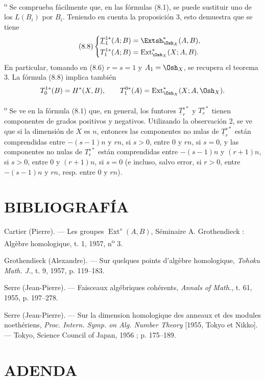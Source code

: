 \medskip
{}\textsuperscript{o} Se comprueba fácilmente que, en las fórmulas
(8.1), se puede sustituir uno de los $L(B_i)$ por $B_i$. Teniendo en cuenta la
proposición 3, esto demuestra que se tiene
\begin{equation}\tag{8.8}
\left\{
\begin{aligned}
  \underline{T}_{1}^{1*}(A;B)&=\Extsh_{\Osh_X}^{*}(A,B),\\
  T_{1}^{1*}(A;B)&=\operatorname{Ext}_{\Osh_X}^{*}(X;A,B).
\end{aligned}
\right.
\end{equation}
En particular, tomando en (8.6) $r=s=1$ y $A_1=\Osh_X$, se recupera el
teorema 3. La fórmula (8.8) implica también
\[
  T_{0}^{1*}(B)=H^{*}(X,B),
  \qquad
  T_{1}^{0*}(A)=\operatorname{Ext}_{\Osh_X}^{*}(X;A,\Osh_X).
\]

\medskip
{}\textsuperscript{o} Se ve en la fórmula (8.1) que, en general, los
funtores $\underline{T}_{r}^{s*}$ y $T_{r}^{s*}$ tienen componentes de
grados positivos y negativos. Utilizando la observación 2, se ve que si la
dimensión de $X$ es $n$, entonces las componentes no nulas de
$\underline{T}_{r}^{s*}$ están comprendidas entre $-(s-1)n$ y $rn$, si $s>0$,
entre $0$ y $rn$, si $s=0$, y las componentes no nulas de $T_{r}^{s*}$
están comprendidas entre $-(s-1)n$ y $(r+1)n$, si $s>0$, entre $0$ y $(r+1)n$,
si $s=0$ (e incluso, salvo error, si $r>0$, entre $-(s-1)n$ y $rn$, resp. entre
$0$ y $rn$).

\section*{BIBLIOGRAFÍA}

\noindent[1] Cartier (Pierre). --- Les groupes
$\operatorname{Ext}^{s}(A,B)$, Séminaire A. Grothendieck : Algèbre homologique,
t. 1, 1957, n\textsuperscript{o} 3.

\noindent[2] Grothendieck (Alexandre). --- Sur quelques points d'algèbre
homologique, \emph{Tohoku Math. J.}, t. 9, 1957, p. 119--183.

\noindent[3] Serre (Jean-Pierre). --- Faisceaux algébriques cohérents,
\emph{Annals of Math.}, t. 61, 1955, p. 197--278.

\noindent[4] Serre (Jean-Pierre). --- Sur la dimension homologique des anneaux
et des modules noethériens, \emph{Proc. Intern. Symp. on Alg. Number Theory}
[1955, Tokyo et Nikko]. --- Tokyo, Science Council of Japan, 1956 ;
p. 175--189.

\clearpage
{}
\section*{ADENDA}

